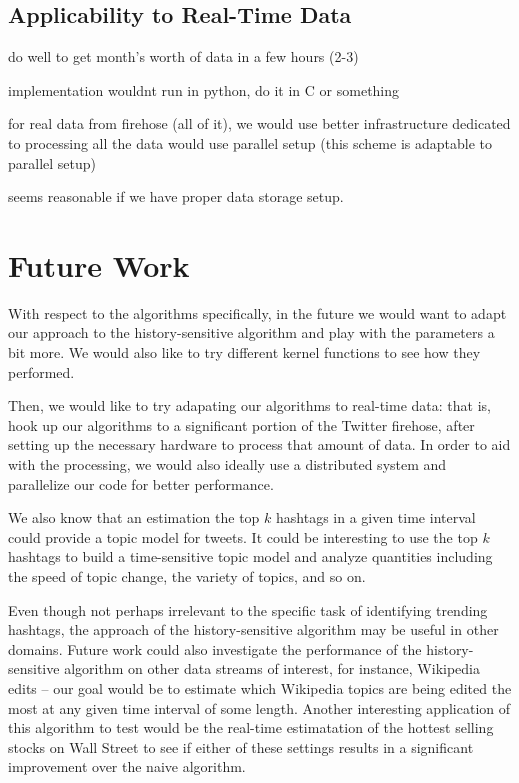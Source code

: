 \documentclass[twoside]{article}
\begin{document}
\subsection{Applicability to Real-Time Data}

do well to get month's worth of data in a few hours (2-3)

implementation wouldnt run in python, do it in C or something

for real data from firehose (all of it), we would use 
better infrastructure dedicated to processing all the data
would use parallel setup (this scheme is adaptable to parallel
setup)

seems reasonable if we have proper data storage setup.


\section{Future Work} \label{sec:Future Work}

With respect to the algorithms specifically, in the future we would want to adapt our approach to the history-sensitive algorithm and play with the parameters a bit more. We would also like to try different kernel functions to see how they performed. 

Then, we would like to try adapating our algorithms to real-time data: that is, hook up our algorithms to a significant portion of the Twitter firehose, after setting up the necessary hardware to process that amount of data. In order to aid with the processing, we would also ideally use a distributed system and parallelize
our code for better performance.

We also know that an estimation the top $k$ hashtags in a given time interval could provide a topic model for tweets. It could be interesting to use the top $k$ hashtags to build a time-sensitive topic model and analyze quantities including the speed of topic change, the variety of topics, and so on.

Even though not perhaps irrelevant to the specific task of identifying trending hashtags, 
the approach of the history-sensitive algorithm may be useful in other domains.
Future work could also investigate the performance of the history-sensitive algorithm on other data streams of interest, for instance, Wikipedia edits -- our goal would be to estimate which Wikipedia topics are being edited the most at any given time interval of some length. Another interesting application of this algorithm to test would be the real-time estimatation of the hottest selling stocks on Wall Street to see if either of these settings results in a significant improvement over the naive algorithm.
\end{document}
